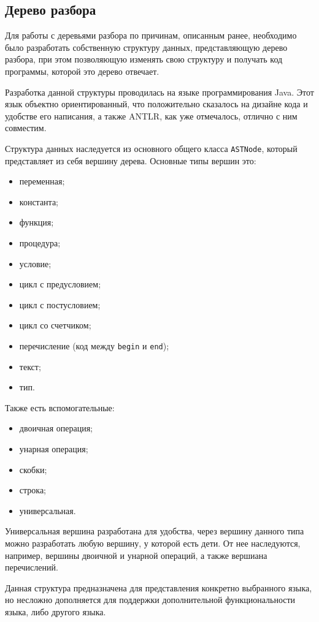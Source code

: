 \subsection{Дерево разбора}

Для работы с деревьями разбора по причинам, описанным ранее, необходимо было разработать собственную структуру данных, представляющую
дерево разбора, при этом позволяющую изменять свою структуру и получать код программы, которой это дерево отвечает.

Разработка данной структуры проводилась на языке программирования Java. Этот язык объектно ориентированный, что положительно сказалось
на дизайне кода и удобстве его написания, а также ANTLR, как уже отмечалось, отлично с ним совместим.

Структура данных наследуется из основного общего класса \texttt{ASTNode}, который представляет из себя вершину дерева.
Основные типы вершин это:
\begin{itemize}
    \item переменная;
    \item константа;
    \item функция;
    \item процедура;
    \item условие;
    \item цикл с предусловием;
    \item цикл с постусловием; 
    \item цикл со счетчиком;
    \item перечисление (код между \texttt{begin} и \texttt{end});
    \item текст;
    \item тип.
\end{itemize}
Также есть вспомогательные:
\begin{itemize}
    \item двоичная операция;
    \item унарная операция;
    \item скобки;
    \item строка;
    \item универсальная.
\end{itemize}

Универсальная вершина разработана для удобства, через вершину данного типа можно разработать любую вершину, у которой есть дети.
От нее наследуются, например, вершины двоичной и унарной операций, а также вершиана перечислений.  

Данная структура предназначена для представления конкретно выбранного языка, но несложно дополняется для поддержки дополнительной
функциональности языка, либо другого языка.

